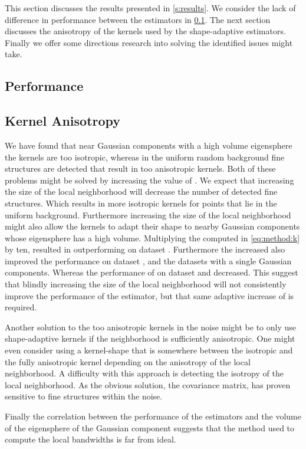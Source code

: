 This section discusses the results presented in \cref{s:results}. We consider the lack of difference in performance between the estimators in \cref{s:discussion:performance}. The next section discusses the anisotropy of the kernels used by the shape-adaptive estimators. Finally we offer some directions research into solving the identified issues might take.

\subsection{Performance}
\label{s:discussion:performance}


\subsection{Kernel Anisotropy}
\label{s:discussion:anisotropy}


We have found that near Gaussian components with a high volume eigensphere the kernels are too isotropic, whereas in the uniform random background fine structures are detected that result in too anisotropic kernels. Both of these problems might be solved by increasing the value of \KNNK. 
We expect that increasing the size of the local neighborhood will decrease the number of detected fine structures. Which results in more isotropic kernels for points that lie in the uniform background.
Furthermore increasing the size of the local neighborhood might also allow the kernels to adapt their shape to nearby Gaussian components whose eigensphere has a high volume. Multiplying the \KNNK computed in \cref{eq:method:k} by ten, resulted in \sambe outperforming \mbe on dataset \baakmanFive. Furthermore the increased \KNNK also improved the performance on dataset \ferdosiThree, \baakmanThree and the datasets with a single Gaussian components. Whereas the performance of \sambe on dataset \ferdosiTwo and \baakmanTwo decreased. This suggest that blindly increasing the size of the local neighborhood will not consistently improve the performance of the estimator, but that same adaptive increase of \KNNK is required.

Another solution to the too anisotropic kernels in the noise might be to only use shape-adaptive kernels if the neighborhood is sufficiently anisotropic. One might even consider using a kernel-shape that is somewhere between the isotropic and the fully anisotropic kernel depending on the anisotropy of the local neighborhood. A difficulty with this approach is detecting the isotropy of the local neighborhood. As the obvious solution, the covariance matrix, has proven sensitive to fine structures within the noise. 

Finally the correlation between the performance of the estimators and the volume of the eigensphere of the Gaussian component suggests that the method used to compute the local bandwidths is far from ideal. 